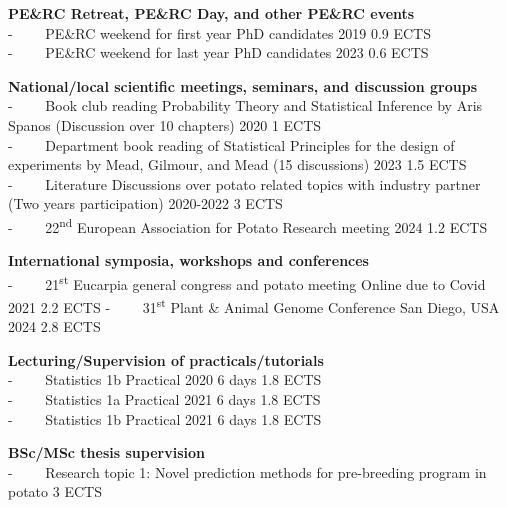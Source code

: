 {\textbf{PE\&RC Retreat, PE\&RC Day, and other PE\&RC events} \\
- ~~~~PE\&RC weekend for first year PhD candidates \textbar{} 2019
  \textbar{} 0.9 ECTS \\
- ~~~~PE\&RC weekend for last year PhD candidates \textbar{} 2023 \textbar{}
  0.6 ECTS

\textbf{National/local scientific meetings, seminars, and discussion
groups} \\
- ~~~~Book club reading Probability Theory and Statistical Inference by Aris
  Spanos (Discussion over 10 chapters) \textbar{} 2020 \textbar{} 1 ECTS \\
- ~~~~Department book reading of Statistical Principles for the design of
  experiments by Mead, Gilmour, and Mead (15 discussions) \textbar{}
  2023 \textbar{} 1.5 ECTS \\
- ~~~~Literature Discussions over potato related topics with industry
  partner (Two years participation) \textbar{} 2020-2022 \textbar{} 3
  ECTS \\
- ~~~~22\textsuperscript{nd} European Association for Potato Research
  meeting \textbar{} 2024 \textbar{} 1.2 ECTS

\textbf{International symposia, workshops and conferences}\\
- ~~~~21\textsuperscript{st} Eucarpia general congress and potato meeting
  \textbar{} Online due to Covid \textbar{} 2021 \textbar{} 2.2 ECTS
- ~~~~31\textsuperscript{st} Plant \& Animal Genome Conference \textbar{}
  San Diego, USA \textbar{} 2024 \textbar{} 2.8 ECTS

\textbf{Lecturing/Supervision of practicals/tutorials} \\
- ~~~~Statistics 1b Practical \textbar{} 2020 \textbar{} 6 days \textbar{}
  1.8 ECTS \\
- ~~~~Statistics 1a Practical \textbar{} 2021 \textbar{} 6 days \textbar{}
  1.8 ECTS \\
- ~~~~Statistics 1b Practical \textbar{} 2021 \textbar{} 6 days \textbar{}
  1.8 ECTS

\textbf{BSc/MSc thesis supervision} \\
- ~~~~Research topic 1: Novel prediction methods for pre-breeding program in
  potato \textbar{} 3 ECTS
}
